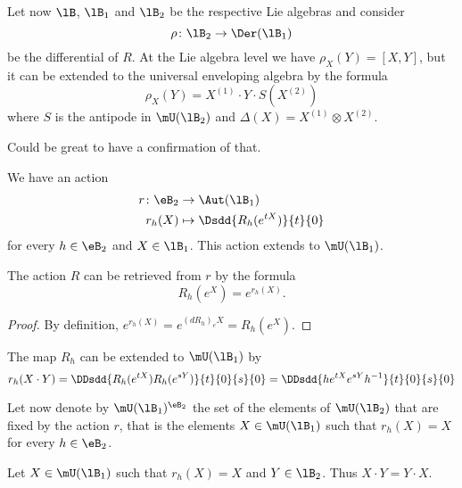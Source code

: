 Let now $\lB$, $\lB_1$ and $\lB_2$ be the respective Lie algebras and consider
\begin{equation}
	\rho\colon \lB_2\to \Der(\lB_1)
\end{equation}
be the differential of $R$. At the Lie algebra level we have $\rho_X(Y)=[X,Y]$, but it can be extended to the universal enveloping algebra by the formula
\begin{equation}
	\rho_X(Y)=X^{(1)}\cdot Y\cdot S(X^{(2)})
\end{equation}
where $S$ is the antipode in $\mU(\lB_2)$ and $\Delta(X)=X^{(1)}\otimes X^{(2)}$.
\begin{probleme}
	Could be great to have a confirmation of that.
\end{probleme}


We have an action
\begin{equation}
	\begin{aligned}
		r\colon \eB_2&\to \Aut(\lB_1) \\
		r_h(X)&\mapsto \Dsdd{ R_h( e^{tX}) }{t}{0} 
	\end{aligned}
\end{equation}
for every $h\in\eB_2$ and $X\in\lB_1$. This action extends to $\mU(\lB_1)$.

\begin{lemma}
	The action $R$ can be retrieved from $r$ by the formula
	\begin{equation}
		R_h( e^{X})= e^{r_h(X)}.
	\end{equation}
\end{lemma}

\begin{proof}
	By definition, $ e^{r_h(X)}= e^{(dR_h)_eX}=R_h( e^{X})$.
\end{proof}

The map $R_h$ can be extended to $\mU(\lB_1)$ by
\begin{equation}
	r_h(X\cdot Y)=\DDsdd{ R_h( e^{tX})R_h( e^{sY}) }{t}{0}{s}{0}=\DDsdd{ h e^{tX} e^{sY}h^{-1} }{t}{0}{s}{0}
\end{equation}

Let now denote by $\mU(\lB_1)^{\eB_2}$ the set of the elements of $\mU(\lB_2)$ that are fixed by the action $r$, that is the elements $X\in\mU(\lB_1)$ such that $r_h(X)=X$ for every $h\in\eB_2$.

\begin{lemma}
	Let $X\in\mU(\lB_1)$ such that $r_h(X)=X$ and $Y\in\lB_2$. Thus $X\cdot Y=Y\cdot X$.
\end{lemma}

